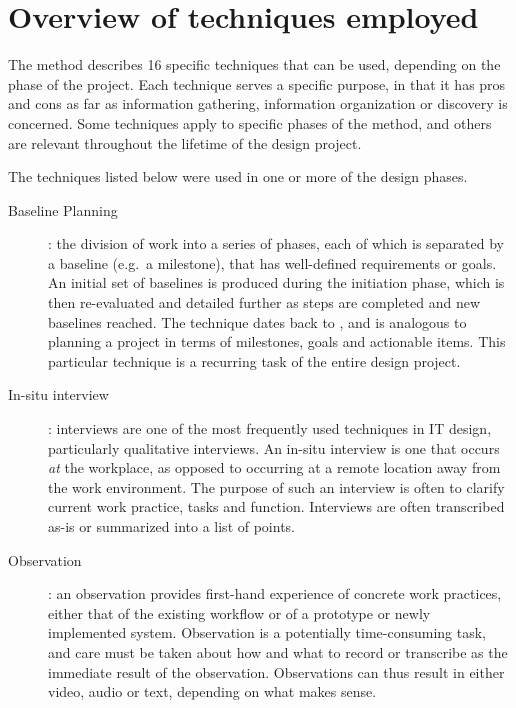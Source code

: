 \section{Overview of techniques employed} \label{sec:overview}
The \must{} method describes 16 specific techniques that can be used, depending
on the phase of the project. Each technique serves a specific purpose, in that it
has pros and cons as far as information gathering, information organization or discovery
is concerned. Some techniques apply to specific phases of the \must{} method, and others
are relevant throughout the lifetime of the design project.

The techniques listed below were used in one or more of the design phases.
\begin{description}
    \item [Baseline Planning]: the division of work into a series of phases,
        each of which is separated by a baseline (e.g.\ a milestone), that has well-defined
        requirements or goals. An initial set of baselines is produced during the initiation
        phase, which is then re-evaluated and detailed further as steps are completed and new
        baselines reached. The technique dates back to \cite{andersen1990professional}, and is
        analogous to planning a project in terms of milestones, goals and actionable items. This
        particular technique is a recurring task of the entire design project.

    \item [In-situ interview]: interviews are one of the most frequently used techniques in IT 
        design, particularly qualitative interviews\cite{bodker2004participatory}. An in-situ
        interview is one that occurs \textit{at} the workplace, as opposed to occurring at a
        remote location away from the work environment. The purpose of such an interview is often
        to clarify current work practice, tasks and function. Interviews are often transcribed as-is
        or summarized into a list of points.

    \item [Observation]: an observation provides first-hand experience of concrete work practices,
        either that of the existing workflow or of a prototype or newly implemented system. Observation
        is a potentially time-consuming task, and care must be taken about how and what to record or transcribe
        as the immediate result of the observation. Observations can thus result in either video, audio or text,
        depending on what makes sense.


\end{description}

